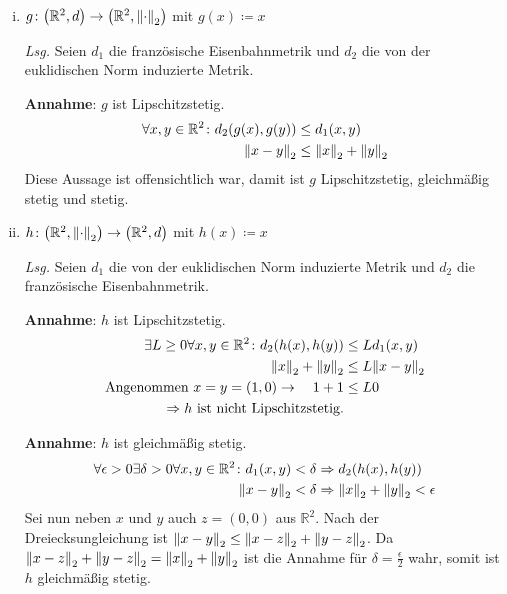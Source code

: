 \documentclass{scrreprt}
\begin{document}
\begin{enumerate}[(i)]
\item $g \colon \qty(\mathbb{R}^2, d) \to \qty(\mathbb{R}^2, \norm{\cdot}_2)$
  mit $g(x) \coloneqq x$

  \textit{Lsg.} Seien $d_1$ die französische Eisenbahnmetrik und $d_2$ die von
  der euklidischen Norm induzierte Metrik.

  \textbf{Annahme}: $g$ ist Lipschitzstetig.
  \begin{align*}
    \forall x, y \in \mathbb{R}^2 \colon d_2(g(x), g(y)) &\leq d_1(x, y) \\
    \norm{x - y}_2 &\leq \norm{x}_2 + \norm{y}_2 \\
  \end{align*}
  Diese Aussage ist offensichtlich war, damit ist $g$ Lipschitzstetig,
  gleichmäßig stetig und stetig.


\newpage
\item $h \colon \qty(\mathbb{R}^2, \norm{\cdot}_2) \to \qty(\mathbb{R}^2, d)$
  mit $h(x) \coloneqq x$

  \textit{Lsg.} Seien $d_1$ die von der euklidischen Norm induzierte Metrik und
  $d_2$ die französische Eisenbahnmetrik.

  \textbf{Annahme}: $h$ ist Lipschitzstetig.
  \begin{align*}
    \exists L \geq 0 \forall x, y \in \mathbb{R}^2 \colon d_2(h(x), h(y)) &\leq L d_1(x, y) \\
    \norm{x}_2 + \norm{y}_2 &\leq L \norm{x - y}_2 \\
    \text{Angenommen $x = y = (1, 0)$} \to \quad 1 + 1 &\leq L 0 \\
    \Rightarrow h \text{ ist nicht Lipschitzstetig.}
  \end{align*}

  \textbf{Annahme}: $h$ ist gleichmäßig stetig.
  \begin{align*}
    \forall \epsilon > 0 \exists \delta > 0 \forall x, y \in \mathbb{R}^2 \colon d_1(x, y) < \delta
    &\Rightarrow d_2(h(x), h(y)) \\
    \norm{x - y}_2 < \delta &\Rightarrow \norm{x}_2 + \norm{y}_2 < \epsilon
  \end{align*}
  Sei nun neben $x$ und $y$ auch $z = (0, 0)$ aus $\mathbb{R}^2$.
  Nach der Dreiecksungleichung ist
  $\norm{x - y}_2 \leq \norm{x - z}_2 + \norm{y - z}_2$.
  Da $\norm{x - z}_2 + \norm{y - z}_2 = \norm{x}_2 + \norm{y}_2$ ist die Annahme
  für $\delta = \frac{\epsilon}{2}$ wahr, somit ist $h$ gleichmäßig stetig.

\end{enumerate}
\end{document}
